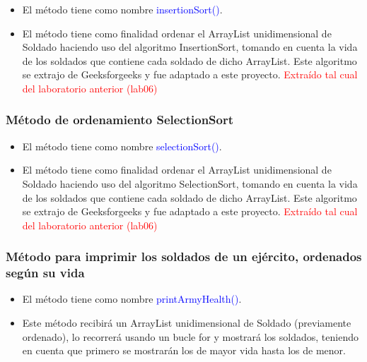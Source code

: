 \documentclass{article}
\begin{document}
        \begin{itemize}
            \item El método tiene como nombre \textcolor{blue}{insertionSort()}.
            \item El método tiene como finalidad ordenar el ArrayList unidimensional de Soldado haciendo uso del algoritmo InsertionSort, tomando en cuenta la vida de los soldados que contiene cada soldado de dicho ArrayList. Este algoritmo se extrajo de Geeksforgeeks y fue adaptado a este proyecto. \textcolor{red}{Extraído tal cual del laboratorio anterior (lab06)}
        \end{itemize}
        
        
        

        \subsubsection{Método de ordenamiento SelectionSort}

        \begin{itemize}
            \item El método tiene como nombre \textcolor{blue}{selectionSort()}.
            \item El método tiene como finalidad ordenar el ArrayList unidimensional de Soldado haciendo uso del algoritmo SelectionSort, tomando en cuenta la vida de los soldados que contiene cada soldado de dicho ArrayList. Este algoritmo se extrajo de Geeksforgeeks y fue adaptado a este proyecto. \textcolor{red}{Extraído tal cual del laboratorio anterior (lab06)}
        \end{itemize}

        
        

        \subsubsection{Método para imprimir los soldados de un ejército, ordenados según su vida}
        
        \begin{itemize}
            \item El método tiene como nombre \textcolor{blue}{printArmyHealth()}.
            \item Este método recibirá un ArrayList unidimensional de Soldado (previamente ordenado), lo recorrerá usando un bucle for y mostrará los soldados, teniendo en cuenta que primero se mostrarán los de mayor vida hasta los de menor.
        \end{itemize}
        
\end{document}
